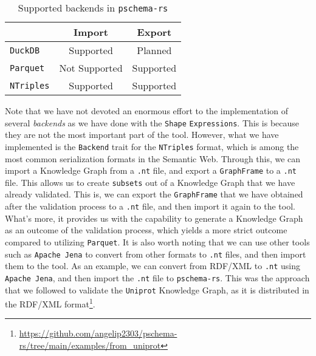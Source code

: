 \begin{table}[ht]
    \centering
    \begin{tabular}{|l|c|c|}
        \hline
        \rowcolor[HTML]{EFEFEF}
        \multicolumn{1}{|c|}{\cellcolor[HTML]{EFEFEF}\textbf{Backend}} & \multicolumn{1}{|c|}{\cellcolor[HTML]{EFEFEF}\textbf{Import}} & \multicolumn{1}{|c|}{\cellcolor[HTML]{EFEFEF}\textbf{Export}} \\ \hline
        \texttt{DuckDB}                                                & {\color[HTML]{009901} Supported}                              & {\color[HTML]{FF4500} Planned}                                \\ \hline
        \texttt{Parquet}                                               & {\color[HTML]{FE0000} Not Supported}                          & {\color[HTML]{009901} Supported}                              \\ \hline
        \texttt{NTriples}                                              & {\color[HTML]{009901} Supported}                              & {\color[HTML]{009901} Supported}                              \\ \hline
    \end{tabular}
    \caption{Supported backends in \texttt{pschema-rs}}
\end{table}

Note that we have not devoted an enormous effort to the implementation of several \textit{backends} as we have done with the \texttt{Shape} \texttt{Expressions}. This is because they are not the most important part of the tool. However, what we have implemented is the \texttt{Backend} trait for the \texttt{NTriples} format, which is among the most common serialization formats in the Semantic Web. Through this, we can import a Knowledge Graph from a \texttt{.nt} file, and export a \texttt{GraphFrame} to a \texttt{.nt} file. This allows us to create \texttt{subsets} out of a Knowledge Graph that we have already validated. This is, we can export the \texttt{GraphFrame} that we have obtained after the validation process to a \texttt{.nt} file, and then import it again to the tool. What's more, it provides us with the capability to generate a Knowledge Graph as an outcome of the validation process, which yields a more strict outcome compared to utilizing \texttt{Parquet}. It is also worth noting that we can use other tools such as \texttt{Apache Jena} to convert from other formats to \texttt{.nt} files, and then import them to the tool. As an example, we can convert from RDF/XML to \texttt{.nt} using \texttt{Apache Jena}, and then import the \texttt{.nt} file to \texttt{pschema-rs}. This was the approach that we followed to validate the \texttt{Uniprot} Knowledge Graph, as it is distributed in the RDF/XML format\footnote{\url{https://github.com/angelip2303/pschema-rs/tree/main/examples/from_uniprot}}.

